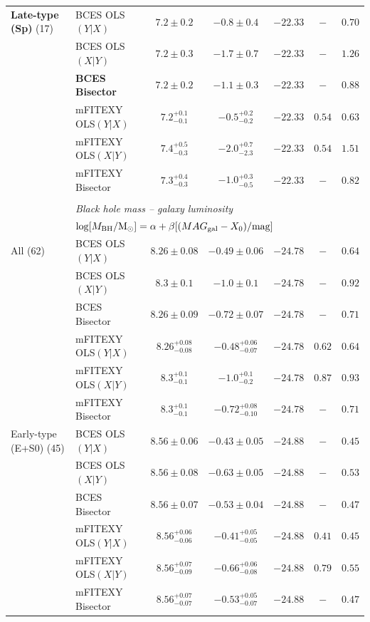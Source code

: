 \documentclass[preprint2]{emulateapj}
\begin{document}
\begin{table}
\begin{tabular}{llccccc}
{\bf Late-type (Sp)} (17) & BCES OLS$(Y|X)$    & $7.2 \pm 0.2$ & $-0.8 \pm 0.4$ & $-22.33$ & $-$    & $0.70$ \\
 		   	  & BCES OLS$(X|Y)$    & $7.2 \pm 0.3$ & $-1.7 \pm 0.7$ & $-22.33$ & $-$    & $1.26$ \\
 		   	  & {\bf BCES Bisector}& $\boldsymbol{7.2 \pm 0.2}$ & $\boldsymbol{-1.1 \pm 0.3}$ & $\boldsymbol{-22.33}$ & $-$    & $\boldsymbol{0.88}$ \\
 		   	  & mFITEXY OLS$(Y|X)$ & $7.2^{+0.1}_{-0.1}$ & $-0.5^{+0.2}_{-0.2}$ & $-22.33$ & $0.54$ & $0.63$ \\
 		   	  & mFITEXY OLS$(X|Y)$ & $7.4^{+0.5}_{-0.3}$ & $-2.0^{+0.7}_{-2.3}$ & $-22.33$ & $0.54$ & $1.51$ \\
 		   	  & mFITEXY Bisector   & $7.3^{+0.4}_{-0.3}$ & $-1.0^{+0.3}_{-0.5}$ & $-22.33$ & $-$	& $0.82$ \\
\hline 
\\
 & \multicolumn{6}{l}{\emph{Black hole mass -- galaxy luminosity}} \\
  & \multicolumn{6}{l}{$\log[M_{\rm BH}/{\rm M_\odot}] = \alpha + \beta[(MAG_{\rm gal} - X_0)/{\rm mag}]$} \\ [0.5em]
All (62)               & BCES OLS$(Y|X)$   & $8.26 \pm 0.08$ & $-0.49 \pm 0.06$ & $-24.78$ & $-$ & $0.64$ \\
 		       & BCES OLS$(X|Y)$   & $8.3 \pm 0.1$   & $-1.0 \pm 0.1$   & $-24.78$ & $-$ & $0.92$ \\
 		       & BCES Bisector     & $8.26 \pm 0.09$ & $-0.72 \pm 0.07$ & $-24.78$ & $-$ & $0.71$ \\
 		       & mFITEXY OLS$(Y|X)$ & $8.26^{+0.08}_{-0.08}$ & $-0.48^{+0.06}_{-0.07}$ & $-24.78$ & $0.62$ & $0.64$ \\
 		       & mFITEXY OLS$(X|Y)$ & $8.3^{+0.1}_{-0.1}$    & $-1.0^{+0.1}_{-0.2}$    & $-24.78$ & $0.87$ & $0.93$ \\
 		       & mFITEXY Bisector   & $8.3^{+0.1}_{-0.1}$    & $-0.72^{+0.08}_{-0.10}$ & $-24.78$ & $-$    & $0.71$ \\
		   
Early-type (E+S0) (45) & BCES OLS$(Y|X)$   & $8.56 \pm 0.06$ & $-0.43 \pm 0.05$ & $-24.88$ & $-$ & $0.45$ \\
 		       & BCES OLS$(X|Y)$   & $8.56 \pm 0.08$ & $-0.63 \pm 0.05$ & $-24.88$ & $-$ & $0.53$ \\
 		       & BCES Bisector     & $8.56 \pm 0.07$ & $-0.53 \pm 0.04$ & $-24.88$ & $-$ & $0.47$ \\
 		       & mFITEXY OLS$(Y|X)$ & $8.56^{+0.06}_{-0.06}$ & $-0.41^{+0.05}_{-0.05}$ & $-24.88$ & $0.41$ & $0.45$ \\
 		       & mFITEXY OLS$(X|Y)$ & $8.56^{+0.07}_{-0.09}$ & $-0.66^{+0.06}_{-0.08}$ & $-24.88$ & $0.79$ & $0.55$ \\
 		       & mFITEXY Bisector   & $8.56^{+0.07}_{-0.07}$ & $-0.53^{+0.05}_{-0.07}$ & $-24.88$ & $-$    & $0.47$ \\
		   

\end{tabular}
\end{table}
\end{document}
